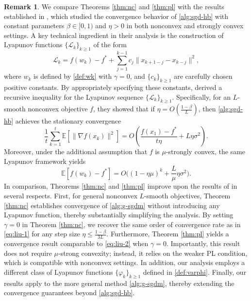 \documentclass[10pt]{article}
\numberwithin{equation}{section}
\theoremstyle{definition}
\newtheorem{remark}{Remark}
\newcommand{\ebb}{\mathbb{E}}  %
\begin{document}
\begin{remark}
    We compare Theorems \ref{thm:nc} and \ref{thm:pl} with the results established in \citep{liu2020improved}, which studied the convergence behavior of \eqref{alg:sgd-hb} with constant parameters $\beta\in[0,1)$ and $\eta>0$ in both nonconvex and strongly convex settings.  A key technical ingredient in their analysis is the construction of Lyapunov functions $\{\mathcal{L}_k\}_{k\ge 1}$ of the form
    \[
    \mathcal{L}_k=f(w_k)-f^*+\sum_{j=1}^{k-1} c_j\|x_{k+1-j}-x_{k-j}\|^2,
    \]
    where $w_k$ is defined by \eqref{def:wk} with $\gamma=0$, and $\{c_k\}_{k\ge 1}$ are carefully chosen positive constants.
    By appropriately specifying these constants, \citep{liu2020improved} derived a recursive inequality for the Lyapunov sequence $\{\mathcal{L}_k\}_{k\ge1}$. Specifically, for an $L$-smooth nonconvex objective $f$, they showed that if $\eta=O(\frac{1-\beta}{L})$, then \eqref{alg:sgd-hb} achieves the stationary convergence
    \begin{equation}\label{eq:liu-1}
        \frac{1}{t}\sum_{k=1}^t \ebb[\|\nabla f(x_k)\|^2]=O\left(\frac{f\left(x_1\right)-f^*}{t \eta}+L \eta \sigma^2\right).
    \end{equation}
    Moreover, under the additional assumption that $f$ is $\mu$-strongly convex, the same Lyapunov framework yields
    \begin{equation}\label{eq:liu-2}
        \ebb[f(w_k)-f^*]=O\Big((1-\eta \mu)^k+\frac{L}{\mu} \eta \sigma^2\Big).
    \end{equation}    
    In comparison, Theorems \ref{thm:nc} and \ref{thm:pl} improve upon the results of \citep{liu2020improved} in several respects. First, for general nonconvex $L$-smooth objectives, Theorem \ref{thm:nc} establishes convergence of \eqref{alg:g-sgdm} without introducing any Lyapunov function, thereby substantially simplifying the analysis. By setting $\gamma=0$ in Theorem \ref{thm:nc}, we recover the same order of convergence rate as in \eqref{eq:liu-1} for any step size $\eta\leq\frac{1-\beta}{3L}$. Furthermore, Theorem \ref{thm:pl} yields a convergence result comparable to \eqref{eq:liu-2} when $\gamma=0$. Importantly, this result does not require $\mu$-strong convexity; instead, it relies on the weaker PL condition, which is compatible with nonconvex settings. In addition, our analysis employs a different class of Lyapunov functions $\{\varphi_k\}_{k\ge1}$ defined in \eqref{def:varphi}. Finally, our results apply to the more general method \eqref{alg:g-sgdm}, thereby extending the convergence guarantees beyond \eqref{alg:sgd-hb}.
\end{remark}
\end{document}
